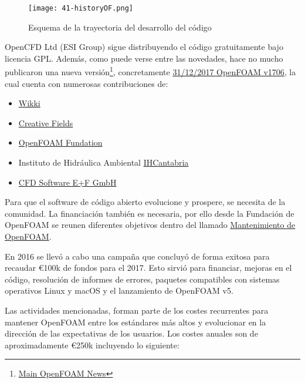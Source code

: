 \begin{figure}
\centering
\texttt{[image: 41-historyOF.png]}
\caption[Esquema de la trayectoria del desarrollo del código]{Esquema de la trayectoria del desarrollo del código \cite{higuera16}}
\label{fig:historyOF}
\end{figure}

OpenCFD Ltd (ESI Group) sigue distribuyendo el código gratuitamente bajo
licencia GPL. Además, como puede verse entre las novedades, hace no
mucho publicaron una nueva versión\footnote{
\href{https://www.openfoam.com/news/}{Main OpenFOAM News}}, concretamente
\href{https://www.openfoam.com/releases/openfoam-v1706/}{31/12/2017
OpenFOAM v1706}, la cual cuenta con numerosas contribuciones de:

\begin{itemize}
\item
  \href{http://www.wikki.co.uk/}{Wikki}
\item
  \href{https://cfmesh.com/company/}{Creative Fields}
\item
  \href{http://openfoam.org}{OpenFOAM Fundation}\\
\item
  Instituto de Hidráulica Ambiental
  \href{http://www.ihcantabria.com/en/}{IHCantabria}
\item
  \href{http://www.cfd-berlin.com/}{CFD Software E+F GmbH}
\end{itemize}

Para que el software de código abierto evolucione y prospere, se
necesita de la comunidad. La financiación también es necesaria, por ello
desde la Fundación de OpenFOAM se reunen diferentes objetivos dentro del
llamado \href{https://openfoam.org/news/funding-2018/}{Mantenimiento de
OpenFOAM}.

En 2016 se llevó a cabo una campaña que concluyó de forma exitosa para
recaudar \euro{}100k de fondos para el 2017. Esto sirvió para financiar,
mejoras en el código, resolución de informes de errores, paquetes
compatibles con sistemas operativos Linux y macOS y el lanzamiento de
OpenFOAM v5.

Las actividades mencionadas, forman parte de los costes recurrentes para
mantener OpenFOAM entre los estándares más altos y evolucionar en la
dirección de las expectativas de los usuarios. Los costes anuales son de
aproximadamente \euro{}250k incluyendo lo siguiente:

